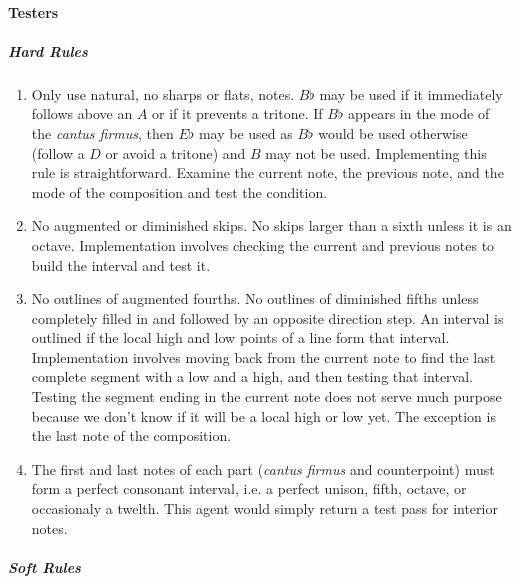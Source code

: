 \paragraph{Testers}
\subparagraph{Hard Rules}
	\begin{enumerate}
		\item Only use natural, no sharps or flats, notes. $B\flat$ may be used if it immediately follows above an $A$ or if it prevents a tritone.
					If $B\flat$ appears in the mode of the \emph{cantus firmus}, then $E\flat$ may be used as $B\flat$ would be used otherwise (follow a $D$ or avoid a tritone) and $B$ may not be used.
					Implementing this rule is straightforward. Examine the current note, the previous note, and the mode of the composition and test the condition.

		\item No augmented or diminished skips. No skips larger than a sixth unless it is an octave.
					Implementation involves checking the current and previous notes to build the interval and test it.

		\item No outlines of augmented fourths. No outlines of diminished fifths unless completely filled in and followed by an opposite direction step.
					An interval is outlined if the local high and low points of a line form that interval.
					Implementation involves moving back from the current note to find the last complete segment with a low and a high, and then testing that interval.
					Testing the segment ending in the current note does not serve much purpose because we don't know if it will be a local high or low yet. The exception is the last note of the composition.

		\item The first and last notes of each part (\emph{cantus firmus} and counterpoint) must form a perfect consonant interval, i.e. a perfect unison, fifth, octave, or occasionaly a twelth.
					This agent would simply return a test pass for interior notes.

	\end{enumerate}
\subparagraph{Soft Rules}
